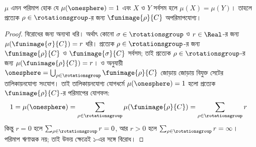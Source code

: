 \documentclass[../../../include/open-logic-section]{subfiles}
\begin{document}
\begin{cor}[ভিতালি]
$\mu$ এমন পরিমাপ হোক যে
$\mu(\onesphere)=1$ এবং $X$ ও $Y$
সর্বসম হলে $\mu(X)=\mu(Y)$।
তাহলে প্রত্যেক $\rho\in\rotationsgroup$-র
জন্য $\funimage{\rho}{C}$ অপরিমাপযোগ্য।
\end{cor}

\begin{proof}
বিরোধের জন্য অন্যথা ধরি। অর্থাৎ কোনো
$\sigma\in\rotationsgroup$ ও
$r\in\Real$-র জন্য
$\mu(\funimage{\sigma}{C})=r$ ধরি।
প্রত্যেক $\rho\in\rotationsgroup$-র জন্য
$\funimage{\rho}{C}$ ও
$\funimage{\sigma}{C}$ সর্বসম; তাই
প্রত্যেক $\rho\in\rotationsgroup$-র
জন্য $\mu(\funimage{\rho}{C})=r$।
 ও
 অনুযায়ী
$\onesphere=\bigcup_{\rho\in\rotationsgroup}
\funimage{\rho}{C}$ জোড়ায় জোড়ায়
বিযুক্ত সেটের তালিকায়নযোগ্য সংযোগ।
তাই তালিকায়নযোগ্য যোগধর্মে
$\mu(\onesphere)=1$ হলো প্রত্যেক
$\funimage{\rho}{C}$-র পরিমাপের যোগফল:
\[
	1 = \mu(\onesphere) = \sum_{\rho \in \rotationsgroup}\mu(\funimage{\rho}{C}) = \sum_{\rho \in \rotationsgroup}r
\]
কিন্তু $r=0$ হলে
$\sum_{\rho\in\rotationsgroup}r=0$,
আর $r>0$ হলে
$\sum_{\rho\in\rotationsgroup}r=\infty$।
পরিমাপ ঋণাত্মক নয়; তাই উভয় ক্ষেত্রেই
১-এর সঙ্গে বিরোধ।
\end{proof}
\end{document}
